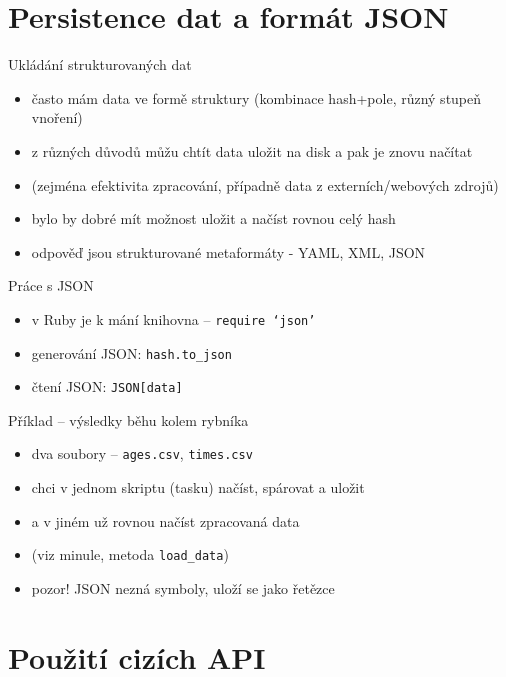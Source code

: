 \documentclass{beamer}
\begin{document}
\section{Persistence dat a formát JSON}

\begin{frame}{Ukládání strukturovaných dat}
  \begin{itemize}
    \item často mám data ve formě struktury (kombinace hash+pole, různý stupeň vnoření)
    \item z různých důvodů můžu chtít data uložit na disk a pak je znovu načítat
    \item (zejména efektivita zpracování, případně data z externích/webových zdrojů)
    \item bylo by dobré mít možnost uložit a načíst rovnou celý hash
    \item odpověď jsou strukturované metaformáty - YAML, XML, JSON
  \end{itemize}
\end{frame}

\begin{frame}{Práce s JSON}
  \begin{itemize}
    \item v Ruby je k mání knihovna -- \texttt{require `json'}
    \item generování JSON: \texttt{hash.to\_json}
    \item čtení JSON: \texttt{JSON[data]}
  \end{itemize}
\end{frame}

\begin{frame}{Příklad -- výsledky běhu kolem rybníka}
  \begin{itemize}
    \item dva soubory -- \texttt{ages.csv}, \texttt{times.csv}
    \item chci v jednom skriptu (tasku) načíst, spárovat a uložit
    \item a v jiném už rovnou načíst zpracovaná data 
    \item (viz minule, metoda \texttt{load\_data})
    \item pozor! JSON nezná symboly, uloží se jako řetězce
  \end{itemize}
\end{frame}

\section{Použití cizích API}
\end{document}
